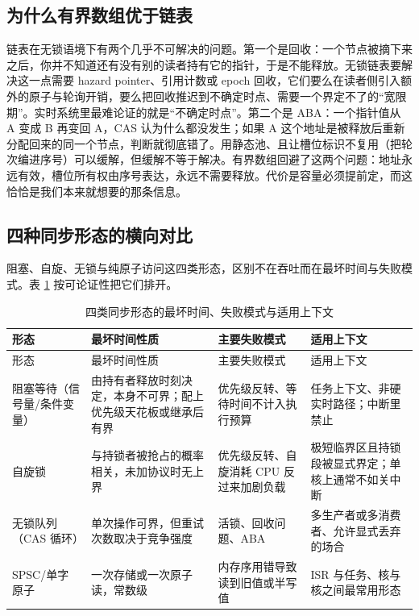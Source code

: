 \documentclass[12pt,a4paper,fontset=fandol]{ctexbook}
\begin{document}
\subsection*{为什么有界数组优于链表}

链表在无锁语境下有两个几乎不可解决的问题。第一个是回收：一个节点被摘下来之后，你并不知道还有没有别的读者持有它的指针，于是不能释放。无锁链表要解决这一点需要 hazard pointer、引用计数或 epoch 回收，它们要么在读者侧引入额外的原子与轮询开销，要么把回收推迟到不确定时点、需要一个界定不了的“宽限期”。实时系统里最难论证的就是“不确定时点”。第二个是 ABA：一个指针值从 A 变成 B 再变回 A，CAS 认为什么都没发生；如果 A 这个地址是被释放后重新分配回来的同一个节点，判断就彻底错了。用静态池、且让槽位标识不复用（把轮次编进序号）可以缓解，但缓解不等于解决。有界数组回避了这两个问题：地址永远有效，槽位所有权由序号表达，永远不需要释放。代价是容量必须提前定，而这恰恰是我们本来就想要的那条信息。

\subsection*{四种同步形态的横向对比}

阻塞、自旋、无锁与纯原子访问这四类形态，区别不在吞吐而在最坏时间与失败模式。表 \ref{tab:ch09-sync-forms} 按可论证性把它们排开。

\begin{longtable}{>{\raggedright\arraybackslash}p{} >{\raggedright\arraybackslash}p{} >{\raggedright\arraybackslash}p{} >{\raggedright\arraybackslash}p{}}
\caption{四类同步形态的最坏时间、失败模式与适用上下文}\label{tab:ch09-sync-forms}\\
\toprule
形态 & 最坏时间性质 & 主要失败模式 & 适用上下文 \\
\midrule
\endfirsthead
\toprule
形态 & 最坏时间性质 & 主要失败模式 & 适用上下文 \\
\midrule
\endhead
\bottomrule
\endfoot
\endlastfoot
阻塞等待（信号量/条件变量） & 由持有者释放时刻决定，本身不可界；配上优先级天花板或继承后有界 & 优先级反转、等待时间不计入执行预算 & 任务上下文、非硬实时路径；中断里禁止 \\
\addlinespace
自旋锁 & 与持锁者被抢占的概率相关，未加协议时无上界 & 优先级反转、自旋消耗 CPU 反过来加剧负载 & 极短临界区且持锁段被显式界定；单核上通常不如关中断 \\
\addlinespace
无锁队列（CAS 循环） & 单次操作可界，但重试次数取决于竞争强度 & 活锁、回收问题、ABA & 多生产者或多消费者、允许显式丢弃的场合 \\
\addlinespace
SPSC/单字原子 & 一次存储或一次原子读，常数级 & 内存序用错导致读到旧值或半写值 & ISR 与任务、核与核之间最常用形态 \\
\end{longtable}
\end{document}

